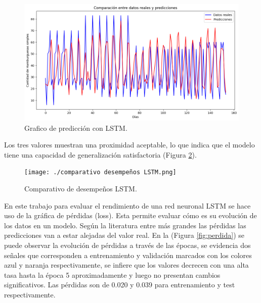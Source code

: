   


\begin{figure}[H]
  \begin{center}
    \includegraphics[scale=0.50]{./predicción 7 días.png}
    \caption{Grafico de predicción con LSTM.}
    \label{fig:grafico_lstm}
  \end{center}
\end{figure}

Los tres valores muestran una proximidad aceptable, lo que indica que el modelo
tiene una capacidad de generalización satisfactoria (Figura
\ref{fig:desenpeño}).
\begin{figure}[H]
  \begin{center}
    \texttt{[image: ./comparativo desempeños LSTM.png]}
    \caption{Comparativo de desempeños LSTM.}
    \label{fig:desenpeño}
  \end{center}
\end{figure}

En este trabajo para evaluar el rendimiento de una red neuronal LSTM se hace
uso de la gráfica de pérdidas (loss). Esta permite evaluar cómo es su evolución
de los datos en un modelo. Según la literatura entre más grandes las pérdidas
las predicciones van a estar alejadas del valor real. En la (Figura
\ref{fig:perdida}) se puede observar la evolución de pérdidas a través de las
épocas, se evidencia dos señales que corresponden a entrenamiento y validación
marcados con los colores azul y naranja respectivamente, se infiere que los
valores decrecen con una alta tasa hasta la época 5 aproximadamente y luego no
presentan cambios significativos. Las pérdidas son de 0.020 y 0.039 para
entrenamiento y test respectivamente.

